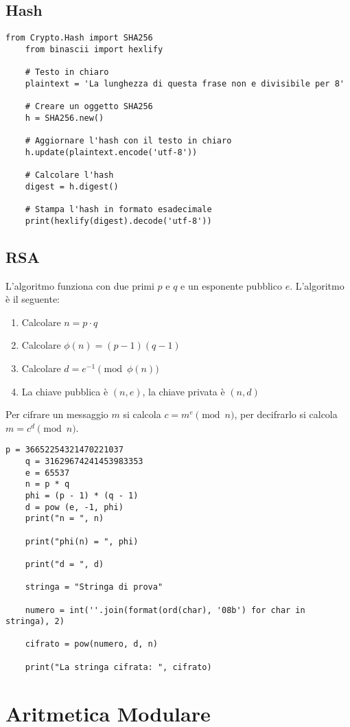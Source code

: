 \subsection{Hash}
\begin{lstlisting}[style=pythonStyle]
    from Crypto.Hash import SHA256
    from binascii import hexlify

    # Testo in chiaro
    plaintext = 'La lunghezza di questa frase non e divisibile per 8'

    # Creare un oggetto SHA256
    h = SHA256.new()

    # Aggiornare l'hash con il testo in chiaro
    h.update(plaintext.encode('utf-8'))

    # Calcolare l'hash
    digest = h.digest()

    # Stampa l'hash in formato esadecimale
    print(hexlify(digest).decode('utf-8'))
\end{lstlisting}
\subsection{RSA}
L'algoritmo funziona con due primi $p$ e $q$ e un esponente pubblico $e$.
L'algoritmo è il seguente:
\begin{enumerate}
    \item Calcolare $n = p \cdot q$
    \item Calcolare $\phi(n) = (p-1)(q-1)$
    \item Calcolare $d = e^{-1} \pmod{\phi(n)}$
    \item La chiave pubblica è $(n, e)$, la chiave privata è $(n, d)$
\end{enumerate}
Per cifrare un messaggio $m$ si calcola $c = m^e \pmod{n}$, per decifrarlo si calcola $m = c^d \pmod{n}$.
\begin{lstlisting}[style=pythonStyle]
    p = 36652254321470221037
    q = 31629674241453983353
    e = 65537
    n = p * q 
    phi = (p - 1) * (q - 1)
    d = pow (e, -1, phi)
    print("n = ", n)

    print("phi(n) = ", phi)

    print("d = ", d)

    stringa = "Stringa di prova"

    numero = int(''.join(format(ord(char), '08b') for char in stringa), 2)

    cifrato = pow(numero, d, n)

    print("La stringa cifrata: ", cifrato)
\end{lstlisting}
\section{Aritmetica Modulare}


